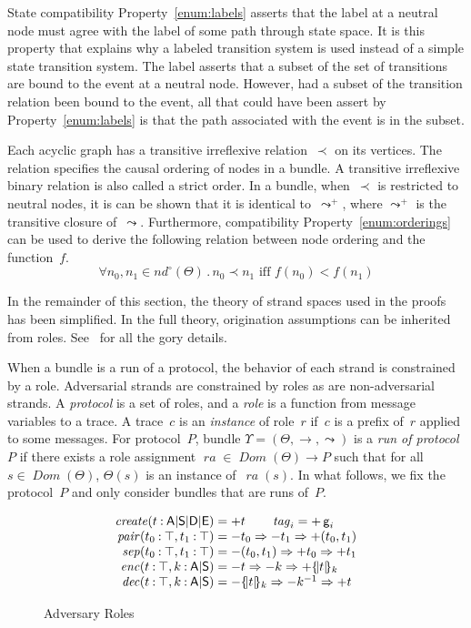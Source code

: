 \documentclass[12pt]{article}
\newcommand{\cn}[1]{\ensuremath{\operatorname{\mathsf{#1}}}}
\newcommand{\fn}[1]{\ensuremath{\operatorname{\mathit{#1}}}}
\newcommand{\srt}[1]{\ensuremath{\mathsf{#1}}}
\newcommand{\typ}{\mathbin:}
\newcommand{\enc}[2]{\ensuremath{\{\!|#1|\!\}_{#2}}}
\newcommand{\invk}[1]{{#1}^{-1}}
\newcommand{\tg}[1]{\cn{g}_{#1}}
\newcommand{\inbnd}{\mathord -}
\newcommand{\outbnd}{\mathord +}
\newcommand{\neutral}{\mathord\circ}
\newcommand{\all}[1]{\forall#1\mathpunct.}
\newcommand{\nnodes}{\operatorname{\mathit{nd}^{\neutral}}}
\newcommand{\key}{\srt{A}|\srt{S}}
\newcommand{\base}{\key|\srt{D}|\srt{E}}
\newcommand{\sdom}{\fn{Dom}}
\newcommand{\ra}{\fn{ra}}
\begin{document}
State compatibility Property~\ref{enum:labels} asserts that the label
at a neutral node must agree with the label of some path through state
space.  It is this property that explains why a labeled transition
system is used instead of a simple state transition system.  The label
asserts that a subset of the set of transitions are bound to the event
at a neutral node.  However, had a subset of the transition relation
been bound to the event, all that could have been assert by
Property~\ref{enum:labels} is that the path associated with the event
is in the subset.

Each acyclic graph has a transitive irreflexive relation~$\prec$ on
its vertices.  The relation specifies the causal ordering of nodes in
a bundle.  A transitive irreflexive binary relation is also called a
strict order.  In a bundle, when~$\prec$ is restricted to neutral
nodes, it is can be shown that it is identical to~$\leadsto^+$, where
$\leadsto^+$ is the transitive closure of~$\leadsto$.  Furthermore,
compatibility Property~\ref{enum:orderings} can be used to derive the
following relation between node ordering and the function~$f$.
$$\all{n_0,n_1\in\nnodes(\Theta)}n_0\prec n_1\mbox{ iff }f(n_0)<f(n_1)$$

In the remainder of this section, the theory of strand spaces used in
the proofs has been simplified.  In the full theory, origination
assumptions can be inherited from roles.  See~\cite{Ramsdell13} for
all the gory details.

When a bundle is a run of a protocol, the behavior of each strand is
constrained by a role.  Adversarial strands are constrained by roles
as are non-adversarial strands.  A \emph{protocol} is a set of roles,
and a \emph{role} is a function from message variables to a trace.  A
trace~$c$ is an \emph{instance} of role~$r$ if~$c$ is a prefix of~$r$
applied to some messages.  For protocol~$P$, bundle
$\Upsilon=(\Theta,\to,\leadsto)$ is a \emph{run of protocol}~$P$ if
there exists a role assignment $\ra\in \sdom(\Theta)\to P$ such that
for all $s\in\sdom(\Theta)$, $\Theta(s)$ is an instance of~$\ra(s)$.
In what follows, we fix the protocol~$P$ and only consider bundles
that are runs of~$P$.

\begin{figure}
$$\begin{array}{r@{{}={}}l}
\fn{create}(t\typ\base)&\outbnd t\qquad\fn{tag}_i=\outbnd\tg{i}\\
\fn{pair}(t_0\typ\top, t_1\typ\top)&
\inbnd t_0\Rightarrow\inbnd t_1\Rightarrow\outbnd (t_0,t_1)\\
\fn{sep}(t_0\typ\top, t_1\typ\top)&
\inbnd (t_0, t_1)\Rightarrow\outbnd t_0\Rightarrow\outbnd t_1\\
\fn{enc}(t\typ\top, k\typ\srt{A}|\srt{S})&
\inbnd t\Rightarrow\inbnd k\Rightarrow\outbnd \enc{t}{k}\\
\fn{dec}(t\typ\top, k\typ\key)&
\inbnd \enc{t}{k}\Rightarrow\inbnd\invk{k}\Rightarrow\outbnd t
\end{array}$$
\caption{Adversary Roles}\label{fig:adversary}
\end{figure}
\end{document}
